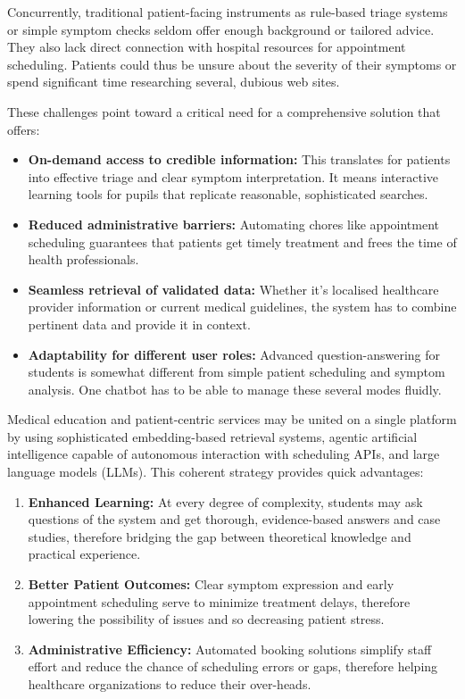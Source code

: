 \noindent Concurrently, traditional patient-facing instruments as rule-based triage systems or simple symptom checks seldom offer enough background or tailored advice.  They also lack direct connection with hospital resources for appointment scheduling.  Patients could thus be unsure about the severity of their symptoms or spend significant time researching several, dubious web sites.


\noindent These challenges point toward a critical need for a comprehensive solution that offers:
\begin{itemize}[itemsep=2em]
    \item \textbf{On-demand access to credible information:} 
    This translates for patients into effective triage and clear symptom interpretation. It means interactive learning tools for pupils that replicate reasonable, sophisticated searches.
    
    \item \textbf{Reduced administrative barriers:} 
    Automating chores like appointment scheduling guarantees that patients get timely treatment and frees the time of health professionals.
    
    \item \textbf{Seamless retrieval of validated data:} 
    Whether it's localised healthcare provider information or current medical guidelines, the system has to combine pertinent data and provide it in context.
    
    \item \textbf{Adaptability for different user roles:}
    Advanced question-answering for students is somewhat different from simple patient scheduling and symptom analysis. One chatbot has to be able to manage these several modes fluidly.
\end{itemize}


\noindent Medical education and patient-centric services may be united on a single platform by using sophisticated embedding-based retrieval systems, agentic artificial intelligence capable of autonomous interaction with scheduling APIs, and large language models (LLMs). This coherent strategy provides quick advantages:
\begin{enumerate}[itemsep=2em]
    \item \textbf{Enhanced Learning:} At every degree of complexity, students may ask questions of the system and get thorough, evidence-based answers and case studies, therefore bridging the gap between theoretical knowledge and practical experience.
    \item \textbf{Better Patient Outcomes:} Clear symptom expression and early appointment scheduling serve to minimize treatment delays, therefore lowering the possibility of issues and so decreasing patient stress.
    \item \textbf{Administrative Efficiency:} Automated booking solutions simplify staff effort and reduce the chance of scheduling errors or gaps, therefore helping healthcare organizations to reduce their over-heads.
\end{enumerate}


